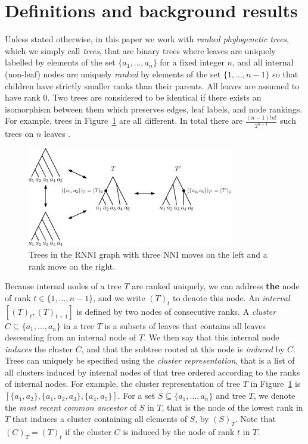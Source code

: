 \documentclass[11pt]{amsart}
\newcommand{\rnni}{\mathrm{RNNI}}
\newcommand{\nni}{\mathrm{NNI}}
\newcommand{\summary}[1]{} %
\begin{document}
\section{Definitions and background results}

\summary{Defining ranked trees and clusters.}
Unless stated otherwise, in this paper we work with \emph{ranked phylogenetic trees}, which we simply call \emph{trees}, that are binary trees where leaves are uniquely labelled by elements of the set $\{a_1, \ldots, a_n\}$ for a fixed integer $n$, and all internal (non-leaf) nodes are uniquely \emph{ranked} by elements of the set $\{1, \ldots, n-1\}$ so that children have strictly smaller ranks than their parents.
All leaves are assumed to have rank $0$.
Two trees are considered to be identical if there exists an isomorphism between them which preserves edges, leaf labels, and node rankings.
For example, trees in Figure~\ref{fig:ranked_trees_ex} are all different.
In total there are $\frac{(n - 1)! n!}{2^{n-1}}$ such trees on $n$ leaves \autocite{Gavryushkin2018-ol}.

\begin{figure}[ht]
\centering
\includegraphics[width=0.8\textwidth]{ranked_trees_ex}
\caption{Trees in the $\rnni$ graph with three $\nni$ moves on the left and a rank move on the right.}
\label{fig:ranked_trees_ex}
\end{figure}

Because internal nodes of a tree $T$ are ranked uniquely, we can address \textbf{the} node of rank $t \in \{1, \ldots, n - 1\}$, and we write $(T)_t$ to denote this node.
An \emph{interval} $[(T)_t,(T)_{t+1}]$ is defined by two nodes of consecutive ranks.
A \emph{cluster} $C \subseteq \{a_1, \ldots, a_n\}$ in a tree $T$ is a subsets of leaves that contains all leaves descending from an internal node of $T$.
We then say that this internal node \emph{induces} the cluster $C$, and that the subtree rooted at this node is \emph{induced} by $C$.
Trees can uniquely be specified using the \emph{cluster representation}, that is a list of all clusters induced by internal nodes of that tree ordered according to the ranks of internal nodes.
For example, the cluster representation of tree $T$ in Figure~\ref{fig:ranked_trees_ex} is $[\{a_1, a_2\}, \{a_1, a_2, a_3\}, \{a_4, a_5\}]$.
For a set $S \subseteq \{a_1, \ldots, a_n\}$ and tree $T$, we denote the \emph{most recent common ancestor} of $S$ in $T$, that is the node of the lowest rank in $T$ that induces a cluster containing all elements of $S$, by $(S)_T$.
Note that $(C)_T = (T)_t$ if the cluster $C$ is induced by the node of rank $t$ in $T$.
\end{document}
